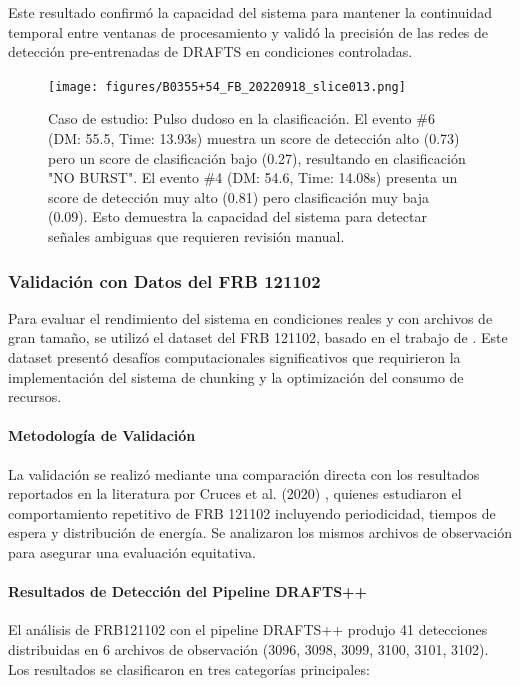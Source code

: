 Este resultado confirmó la capacidad del sistema para mantener la continuidad temporal entre ventanas de procesamiento y validó la precisión de las redes de detección pre-entrenadas de DRAFTS en condiciones controladas.

\begin{figure}[H]
    \centering
    \texttt{[image: figures/B0355+54\_FB\_20220918\_slice013.png]}
    \caption{Caso de estudio: Pulso dudoso en la clasificación. El evento \#6 (DM: 55.5, Time: 13.93s) muestra un score de detección alto (0.73) pero un score de clasificación bajo (0.27), resultando en clasificación "NO BURST". El evento \#4 (DM: 54.6, Time: 14.08s) presenta un score de detección muy alto (0.81) pero clasificación muy baja (0.09). Esto demuestra la capacidad del sistema para detectar señales ambiguas que requieren revisión manual.}
    \label{fig:b0355_slice013}
\end{figure}

\subsubsection{Validación con Datos del FRB 121102}

Para evaluar el rendimiento del sistema en condiciones reales y con archivos de gran tamaño, se utilizó el dataset del FRB 121102, basado en el trabajo de \cite{cruces2020frb121102}. Este dataset presentó desafíos computacionales significativos que requirieron la implementación del sistema de chunking y la optimización del consumo de recursos.

\paragraph{Metodología de Validación}

La validación se realizó mediante una comparación directa con los resultados reportados en la literatura por Cruces et al. (2020) \cite{cruces2020frb121102}, quienes estudiaron el comportamiento repetitivo de FRB 121102 incluyendo periodicidad, tiempos de espera y distribución de energía. Se analizaron los mismos archivos de observación para asegurar una evaluación equitativa.

\paragraph{Resultados de Detección del Pipeline DRAFTS++}

El análisis de FRB121102 con el pipeline DRAFTS++ produjo 41 detecciones distribuidas en 6 archivos de observación (3096, 3098, 3099, 3100, 3101, 3102). Los resultados se clasificaron en tres categorías principales:

